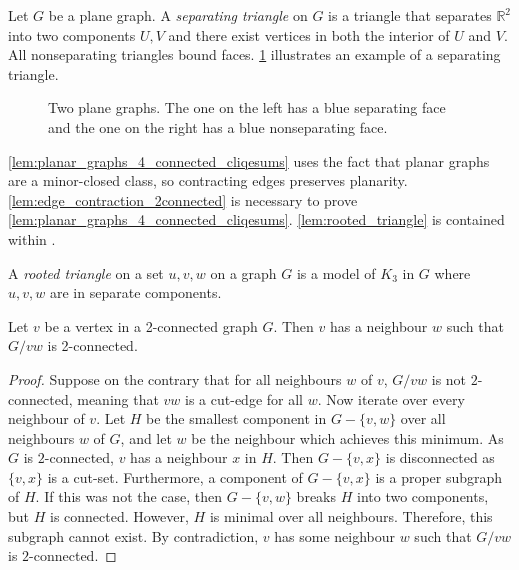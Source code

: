 Let $G$ be a plane graph. A \textit{separating triangle} on $G$ is a triangle that separates $\mathbb{R}^2$ into two components $U, V$ and there exist vertices in both the interior of $U$ and $V$. All nonseparating triangles bound faces. \cref{fig:separating_triangle} illustrates an example of a separating triangle. 
\begin{figure}[h!]
	
	\caption[Separating faces]{Two plane graphs. The one on the left has a blue separating face and the one on the right has a blue nonseparating face.}\label{fig:separating_triangle}
\end{figure}

\cref{lem:planar_graphs_4_connected_cliqesums} uses the fact that planar graphs are a minor-closed class, so contracting edges preserves planarity. \cref{lem:edge_contraction_2connected} is necessary to prove \cref{lem:planar_graphs_4_connected_cliqesums}. \cref{lem:rooted_triangle} is contained within \textcite{woodThomassensChoosabilityArgument2010}.

A \textit{rooted triangle} on a set $u, v, w$ on a graph $G$ is a model of $K_3$ in $G$ where $u, v, w$ are in separate components. 

\begin{lemma}\label{lem:edge_contraction_2connected}
	Let $v$ be a vertex in a 2-connected graph $G$. Then $v$ has a neighbour $w$ such that $G/vw$ is 2-connected.
\end{lemma}
\begin{proof}
	Suppose on the contrary that for all neighbours $w$ of $v$, $G/vw$ is not $2$-connected, meaning that $vw$ is a cut-edge for all $w$. Now iterate over every neighbour of $v$. Let $H$ be the smallest component in $G - \{v,w\}$ over all neighbours $w$ of $G$, and let $w$ be the neighbour which achieves this minimum. As $G$ is $2$-connected, $v$ has a neighbour $x$ in $H$. Then $G - \{v, x\}$ is disconnected as $\{v,x\}$ is a cut-set. Furthermore, a component of $G - \{v,x\}$ is a proper subgraph of $H$. If this was not the case, then $G - \{v,w\}$ breaks $H$ into two components, but $H$ is connected. However, $H$ is minimal over all neighbours. Therefore, this subgraph cannot exist. By contradiction, $v$ has some neighbour $w$ such that $G/vw$ is $2$-connected. 
\end{proof}

